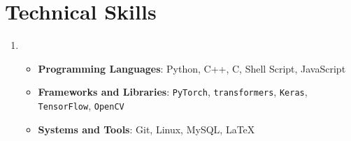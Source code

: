 \documentclass[letterpaper,11pt]{article}
\begin{document}
    \section{Technical Skills}
    \begin{enumerate}[noitemsep, leftmargin=*,label=]
        \item{
            \begin{itemize}[label=\bullet]
                \item{\textbf{Programming Languages}: Python, C++, C, Shell Script, JavaScript}
                \item{\textbf{Frameworks and Libraries}: \texttt{PyTorch}, \texttt{transformers}, \texttt{Keras}, \texttt{TensorFlow}, \texttt{OpenCV}}
                \item{\textbf{Systems and Tools}: Git, Linux, MySQL, \LaTeX}
            \end{itemize}
        }
    \end{enumerate}
    
\end{document}
